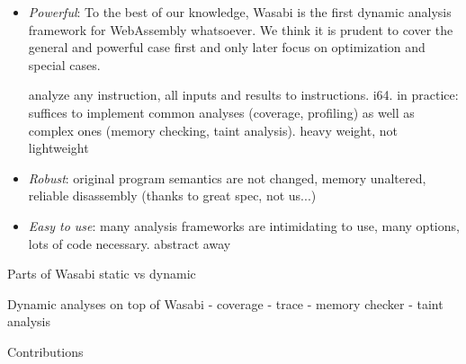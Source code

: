 \documentclass[sigplan,review,anonymous]{acmart}\settopmatter{printfolios=true,printccs=false,printacmref=false}
\begin{document}
\begin{itemize}[leftmargin=\parindent, label=$\circ$]
	\item \emph{Powerful}: To the best of our knowledge, Wasabi is the first dynamic analysis framework for WebAssembly whatsoever. We think it is prudent to cover the general and powerful case first and only later focus on optimization and special cases.
	
	analyze any instruction, all inputs and results to instructions. i64. in practice: suffices to implement common analyses (coverage, profiling) as well as complex ones (memory checking, taint analysis).
	heavy weight, not lightweight
	
	\item \emph{Robust}: original program semantics are not changed, memory unaltered, reliable disassembly (thanks to great spec, not us...)
	
	\item \emph{Easy to use}: many analysis frameworks are intimidating to use, many options, lots of code necessary. abstract away 
	
\end{itemize}

Parts of Wasabi
static vs dynamic

Dynamic analyses on top of Wasabi
- coverage
- trace
- memory checker
- taint analysis

Contributions






%
%
%
\end{document}
